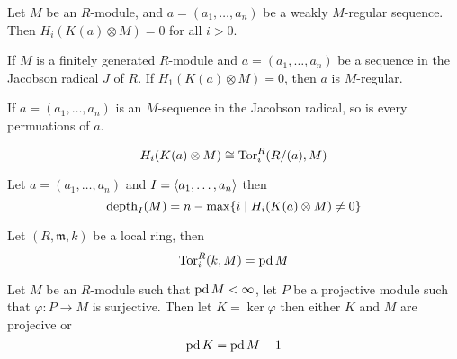 \begin{definition}
\begin{theorem}
	\label{thm:reg_seq_implies_koszul_exact}
	Let $M$ be an $R$-module, and $a = (a_1, \dots, a_n)$ be a weakly $M$-regular sequence.
	Then $H_i(K(a) \otimes M) = 0$ for all $i > 0$.
\end{theorem}

\begin{lemma}
	\label{lem:reg_in_jrad_iff_koszul_exact}
	If $M$ is a finitely generated $R$-module and $a = (a_1, \dots, a_n)$ be a sequence in the Jacobson radical $J$ of $R$.
	If $H_1(K(a) \otimes M) = 0$, then $a$ is $M$-regular.
\end{lemma}

\begin{corollary}
	\label{cor:perm_of_reg_seq_in_jrad_is_reg}
	If $a = (a_1, \dots, a_n)$ is an $M$-sequence in the Jacobson radical, so is every permuations of $a$.
\end{corollary}

\begin{lemma}
	\label{thm:koszul_complex_res_quotient_ring}
\end{lemma}

\begin{lemma}
	\label{lem:tor_measures_koszul_homology}
	$$H_i(K(a) \otimes M) \cong \operatorname{Tor}_i^R (R/(a), M)$$
\end{lemma}

\begin{lemma}
	\label{lem:koszul_homology_mesures_depth}
	Let $a = (a_1, \dots, a_n)$ and $I = \langle a_1, \dots, a_n\rangle$ then
	$$\operatorname{depth}_I(M) = n - \max\{i \mid H_i(K(a) \otimes M) \neq 0\}$$
\end{lemma}

\begin{lemma}
	\label{lem:tor_eq_pd_if_local}
	Let $(R, \mathfrak{m}, k)$ be a local ring, then
	$$\operatorname{Tor}_i^R(k, M) = \operatorname{pd} M$$
\end{lemma}

\begin{proposition}
	\label{prop:globdim_eq_projdim_of_residue}
\end{proposition}

\begin{lemma}
	\label{lem:projdim_ker_eq_one_less}
	Let $M$ be an $R$-module such that $\operatorname{pd} M < \infty$, let $P$ be a projective module such that $\varphi: P \to M$ is surjective.
	Then let $K = \ker \varphi$ then either $K$ and $M$ are projecive or
	$$\operatorname{pd} K = \operatorname{pd} M - 1$$
\end{lemma}


\end{definition}
